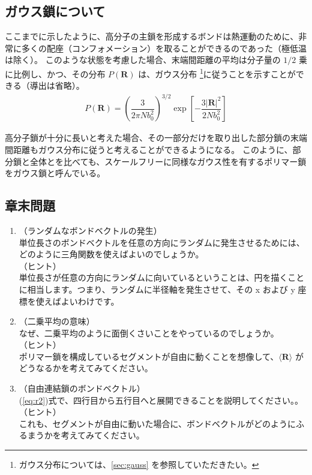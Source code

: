\documentclass[a4paper,11pt]{ltjsarticle}
\begin{document}
\subsection{ガウス鎖について}

ここまでに示したように、高分子の主鎖を形成するボンドは熱運動のために、非常に多くの配座（コンフォメーション）を取ることができるのであった（極低温は除く）。
このような状態を考慮した場合、末端間距離の平均は分子量の $1/2$ 乗に比例し、かつ、その分布 $P(\bm{R})$ は、ガウス分布
\footnote
{
ガウス分布については、\ref{sec:gauss} を参照していただきたい。
}に従うことを示すことができる（導出は省略）。
\begin{align}
P(\bm{R}) =\left( \dfrac{3}{2 \pi N b_0^2} \right)^{3/2} \exp \left[ -\dfrac{3|\bm{R}|^2}{2Nb_0^2} \right]
\end{align}

高分子鎖が十分に長いと考えた場合、その一部分だけを取り出した部分鎖の末端間距離もガウス分布に従うと考えることができるようになる。
このように、部分鎖と全体とを比べても、スケールフリーに同様なガウス性を有するポリマー鎖をガウス鎖と呼んでいる。

\subsection{章末問題}
	\begin{enumerate}
	\item
	\label{it:3-1}
	（ランダムなボンドベクトルの発生）\\
	単位長さのボンドベクトルを任意の方向にランダムに発生させるためには、どのように三角関数を使えばよいのでしょうか。\\
	（ヒント）\\
	単位長さが任意の方向にランダムに向いているということは、円を描くことに相当します。つまり、ランダムに半径軸を発生させて、その x および y 座標を使えばよいわけです。

	\item
	\label{it:3-2}
	（二乗平均の意味）\\
	なぜ、二乗平均のように面倒くさいことをやっているのでしょうか。\\
	（ヒント）\\
	ポリマー鎖を構成しているセグメントが自由に動くことを想像して、$\langle \bm{R} \rangle$ がどうなるかを考えてみてください。

	\item
	\label{it:3-3}
	（自由連結鎖のボンドベクトル）\\
	(\ref{eq:r2})式で、四行目から五行目へと展開できることを説明してください。。\\
	（ヒント）\\
	これも、セグメントが自由に動いた場合に、ボンドベクトルがどのようにふるまうかを考えてみてください。

	\end{enumerate}
\end{document}
